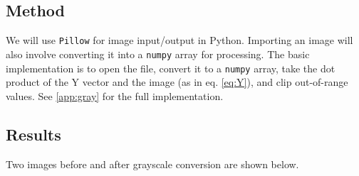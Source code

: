 \documentclass[11pt,a4paper]{article}
\begin{document}
\subsection{Method} 
We will use \verb|Pillow| for image input/output in Python. Importing an image will also involve converting it into a \verb|numpy| array for processing. The basic implementation is to open the file, convert it to a \verb|numpy| array, take the dot product of the Y vector and the image (as in eq. \ref{eq:Y}), and clip out-of-range values. See \ref{app:gray} for the full implementation.

\subsection{Results} 
Two images before and after grayscale conversion are shown below. 
\end{document}
